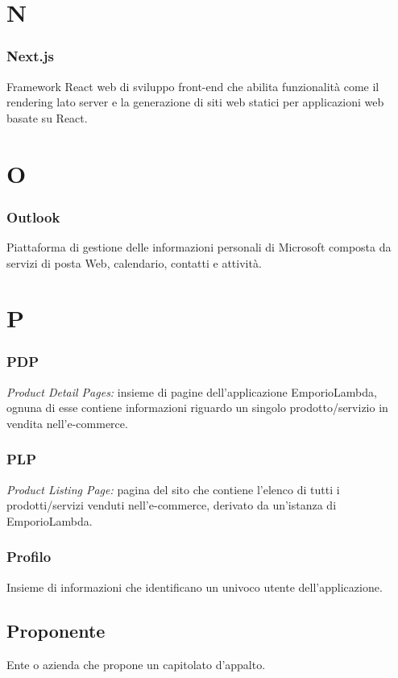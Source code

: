 \section*{N}

\subsubsection*{Next.js}
Framework React web di sviluppo front-end che abilita funzionalità come il rendering lato server e la generazione di siti web statici per applicazioni web basate su React.

\section*{O}
\subsubsection*{Outlook}
Piattaforma di gestione delle informazioni personali di Microsoft composta da servizi di posta Web, calendario, contatti e attività.

\section*{P}
\subsubsection*{PDP}
\textit{Product Detail Pages:} insieme di pagine dell'applicazione EmporioLambda, ognuna di esse contiene informazioni
riguardo un singolo prodotto/servizio in vendita nell'e-commerce.

\subsubsection*{PLP}
\textit{Product Listing Page:} pagina del sito che contiene l'elenco di tutti i prodotti/servizi venduti
nell'e-commerce, derivato da un'istanza di EmporioLambda.

\subsubsection*{Profilo}
Insieme di informazioni che identificano un univoco utente dell'applicazione.

\subsection*{Proponente}
Ente o azienda che propone un capitolato d'appalto.

